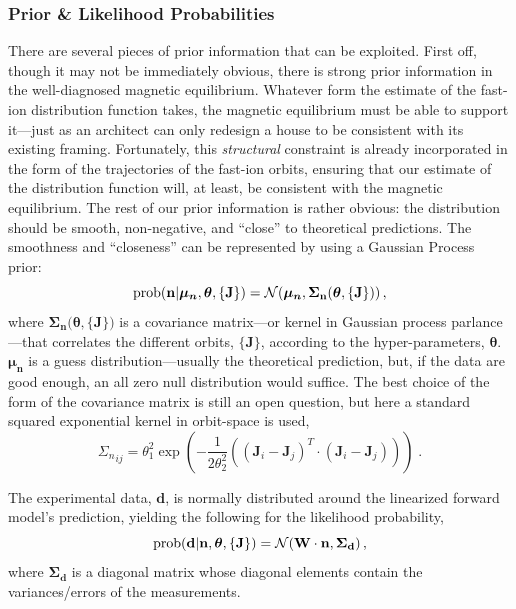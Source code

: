 \subsubsection{Prior \& Likelihood Probabilities}
There are several pieces of prior information that can be exploited.
First off, though it may not be immediately obvious, there is strong prior information in the well-diagnosed magnetic equilibrium.
Whatever form the estimate of the fast-ion distribution function takes, the magnetic equilibrium must be able to support it---just as an architect can only redesign a house to be consistent with its existing framing.
Fortunately, this \textit{structural} constraint is already incorporated in the form of the trajectories of the fast-ion orbits, ensuring that our estimate of the distribution function will, at least, be consistent with the magnetic equilibrium.  
The rest of our prior information is rather obvious: the distribution should be smooth, non-negative, and ``close'' to  theoretical predictions. The smoothness and ``closeness'' can be represented by using a Gaussian Process prior:
\begin{equation}\label{eq:prior}
    \rm{prob}(\mathbf{n}|\boldsymbol{\mu_n},\boldsymbol{\theta},\{\mathbf{J}\})  =
    \mathcal{N}(\boldsymbol{\mu_n},\mathbf{\Sigma_n(\boldsymbol{\theta},\{\mathbf{J}\}}))\,,
\end{equation}
where $\mathbf{\Sigma_n(\boldsymbol{\theta},\{\mathbf{J}\}})$ is a covariance matrix---or kernel in Gaussian process parlance---that correlates the different orbits, $\{\mathbf{J}\}$, according to the hyper-parameters, $\boldsymbol{\theta}$. $\boldsymbol{\mu_n}$ is a guess distribution---usually the theoretical prediction, but, if the data are good enough, an all zero null distribution would suffice.
The best choice of the form of the covariance matrix is still an open question, but here a standard squared exponential kernel in orbit-space is used, 
\begin{equation}\label{eq:kernel}
    {\Sigma_n}_{ij} = \theta_1^2 \exp \left (-\frac{1}{2\theta_2^2}\left ( (\mathbf{J}_i - \mathbf{J}_j)^T\cdot (\mathbf{J}_i - \mathbf{J}_j)\right ) \right ) \;.
\end{equation}

The experimental data, $\mathbf{d}$, is normally distributed around the linearized forward model's prediction, yielding the following for the likelihood probability,
\begin{equation}\label{eq:likelihood}
    \rm{prob}(\mathbf{d}|\mathbf{n},\boldsymbol{\theta},\{\mathbf{J}\}) = \mathcal{N}(\mathbf{W}\cdot\mathbf{n},\mathbf{\Sigma_d}) \,,
\end{equation}
where $\mathbf{\Sigma_d}$ is a diagonal matrix whose diagonal elements contain the variances/errors of the measurements.

